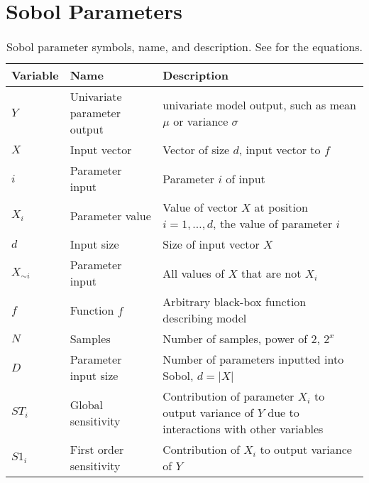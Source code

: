 \section{Sobol Parameters}
\begin{table}[H]
    \small %
    \centering
    \begin{tabularx}{\textwidth}{l l X}
        \toprule
        \textbf{Variable} & \textbf{Name} & \textbf{Description} \\
        \midrule
        $Y$ & Univariate parameter output & univariate model output, such as mean $\mu$ or variance $\sigma$ \\
        $X$ & Input vector & Vector of size $d$, input vector to $f$ \\
        $i$ & Parameter input & Parameter $i$ of input \\
        $X_i$ & Parameter value & Value of vector $X$ at position $i=1, \dots, d$, the value of parameter $i$ \\
        $d$ & Input size & Size of input vector $X$ \\
        $X_{\sim i}$ & Parameter input & All values of $X$ that are not $X_i$ \\
        $f$ & Function $f$ & Arbitrary black-box function describing model \\
        $N$ & Samples & Number of samples, power of 2, $2^x$ \\
        $D$ & Parameter input size & Number of parameters inputted into Sobol, $d=|X|$ \\
        $ST_i$ & Global sensitivity & Contribution of parameter $X_i$ to output variance of $Y$ due to interactions with other variables \\
        $S1_i$ & First order sensitivity & Contribution of $X_i$ to output variance of $Y$ \\
        \bottomrule
    \end{tabularx} \newline
    \caption{
        Sobol parameter symbols, name, and description. 
        See  for the equations. 
    }
    \label{tab:appendixA:parameter_table_Sobol}
\end{table}

